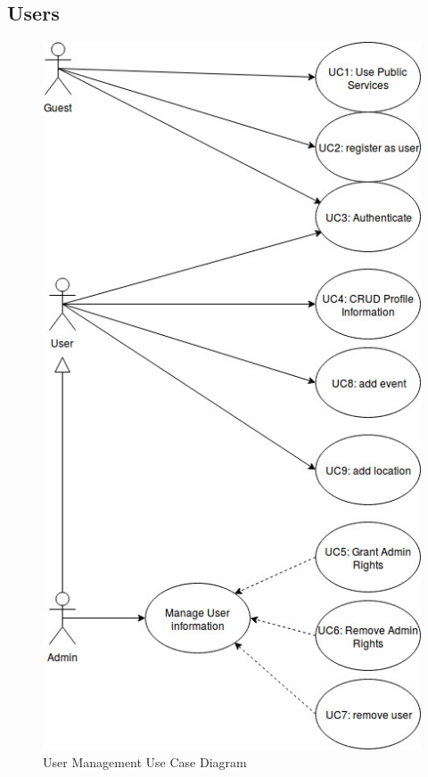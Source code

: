 \documentclass[11pt]{article}
\begin{document}
	\subsection{Users}
	\begin{figure}[!h]
        \centering
        \includegraphics[width=\textwidth]{Diagrams/UserManagement/UserUseCaseDiagram}
        \caption{User Management Use Case Diagram}
        \label{fig:user_use_case}
    \end{figure}
\end{document}
